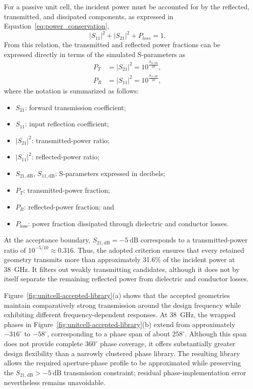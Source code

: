     For a passive unit cell, the incident power must be accounted for by the reflected, transmitted, and dissipated components, as expressed in Equation~\ref{eq:power_conservation},
    \begin{equation}
        \left|S_{11}\right|^{2}+\left|S_{21}\right|^{2}+P_{loss}=1.
        \label{eq:power_conservation}
    \end{equation}
    From this relation, the transmitted and reflected power fractions can be expressed directly in terms of the simulated S-parameters as
    \begin{align}
        P_{T} &= \left|S_{21}\right|^{2} = 10^{\frac{S_{21,\text{dB}}}{10}}, \\
        P_{R} &= \left|S_{11}\right|^{2} = 10^{\frac{S_{11,\text{dB}}}{10}},
        \label{eq:power_definitions}
    \end{align}
    where the notation is summarized as follows:
    \begin{itemize}
        \item $S_{21}$: forward transmission coefficient;
        \item $S_{11}$: input reflection coefficient;
        \item $\left|S_{21}\right|^{2}$: transmitted-power ratio;
        \item $\left|S_{11}\right|^{2}$: reflected-power ratio;
        \item $S_{21,\text{dB}}$, $S_{11,\text{dB}}$: S-parameters expressed in decibels;
        \item $P_{T}$: transmitted-power fraction;
        \item $P_{R}$: reflected-power fraction; and
        \item $P_{\text{loss}}$: power fraction dissipated through dielectric and conductor losses.
    \end{itemize}
    At the acceptance boundary, $S_{21,\mathrm{dB}}=-5~\mathrm{dB}$ corresponds to a transmitted-power ratio of $10^{-5/10}\approx0.316$. Thus, the adopted criterion ensures that every retained geometry transmits more than approximately 31.6\% of the incident power at 38~GHz. It filters out weakly transmitting candidates, although it does not by itself separate the remaining reflected power from dielectric and conductor losses.

    Figure~\ref{fig:unitcell-accepted-library}(a) shows that the accepted geometries maintain comparatively strong transmission around the design frequency while exhibiting different frequency-dependent responses. At 38~GHz, the wrapped phases in Figure~\ref{fig:unitcell-accepted-library}(b) extend from approximately $-316^{\circ}$ to $-58^{\circ}$, corresponding to a phase span of about $258^{\circ}$. Although this span does not provide complete $360^{\circ}$ phase coverage, it offers substantially greater design flexibility than a narrowly clustered phase library. The resulting library allows the required aperture-phase profile to be approximated while preserving the $S_{21,\mathrm{dB}}>-5~\mathrm{dB}$ transmission constraint; residual phase-implementation error nevertheless remains unavoidable.

